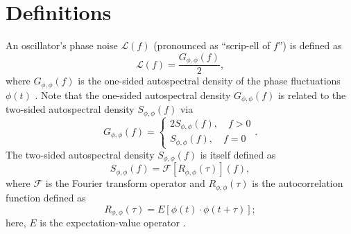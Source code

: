 \section{Definitions}
An oscillator's phase noise $\mathcal{L}(f)$
(pronounced as ``scrip-ell of $f$'')
is defined as
\begin{equation}
  \mathcal{L}(f)
  =
  \frac{G_{\phi,\phi}(f)}{2},
  \label{eq:OscillatorPhaseNoise:oscillator_phase_noise}
\end{equation}
where $G_{\phi,\phi}(f)$ is
the one-sided autospectral density of the phase fluctuations $\phi(t)$
\cite{ieee_std1139}.
Note that the one-sided autospectral density $G_{\phi,\phi}(f)$
is related to the two-sided autospectral density $S_{\phi,\phi}(f)$ via
\begin{equation}
  G_{\phi, \phi}(f)
  =
  \begin{cases}
    2 S_{\phi, \phi}(f), \quad f > 0
    \\
    S_{\phi, \phi}(f), \quad f = 0
  \end{cases}.
\end{equation}
The two-sided autospectral density $S_{\phi,\phi}(f)$ is itself defined as
\begin{equation}
  S_{\phi,\phi}(f)
  =
  \mathcal{F}\left[ R_{\phi,\phi}(\tau) \right](f),
\end{equation}
where $\mathcal{F}$ is the Fourier transform operator and
$R_{\phi,\phi}(\tau)$ is the autocorrelation function defined as
\begin{equation}
  R_{\phi,\phi}(\tau)
  =
  E\left[ \phi(t) \cdot \phi(t + \tau) \right];
\end{equation}
here, $E$ is the expectation-value operator
\cite[Ch.~5]{bendat_and_piersol}.


